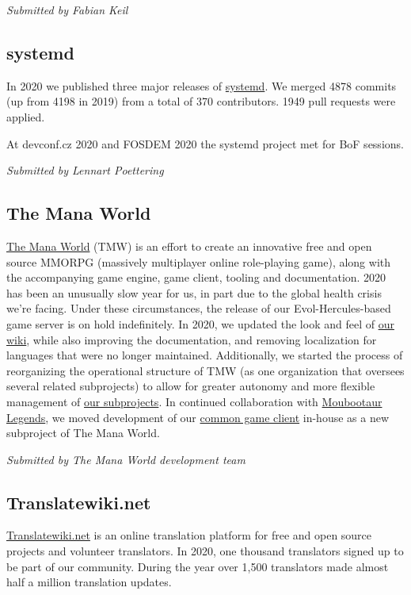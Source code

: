 \documentclass[a4paper]{report}
\begin{document}
{\em Submitted by Fabian Keil}

\subsection{systemd}

In 2020 we published three major releases of \href{https://systemd.io/}{systemd}. We merged 4878 commits (up from 4198 in 2019) from a total of 370 contributors. 1949 pull requests were applied.

At devconf.cz 2020 and FOSDEM 2020 the systemd project met for BoF sessions.

{\em Submitted by Lennart Poettering}

\subsection{The Mana World}

\href{https://www.themanaworld.org/about}{The Mana World} (TMW) is an effort to create an innovative free and open source MMORPG (massively multiplayer online role-playing game), along with the accompanying game engine, game client, tooling and documentation. 2020 has been an unusually slow year for us, in part due to the global health crisis we're facing. Under these circumstances, the release of our Evol-Hercules-based game server is on hold indefinitely. In 2020, we updated the look and feel of \href{https://wiki.themanaworld.org/}{our wiki}, while also improving the documentation, and removing localization for languages that were no longer maintained. Additionally, we started the process of reorganizing the operational structure of TMW (as one organization that oversees several related subprojects) to allow for greater autonomy and more flexible management of \href{https://gitlab.com/themanaworld}{our subprojects}. In continued collaboration with \href{https://moubootaurlegends.org/en/}{Moubootaur Legends}, we moved development of our \href{https://gitlab.com/themanaworld/manaplus/manaplus}{common game client} in-house as a new subproject of The Mana World.

{\em Submitted by The Mana World development team}

\subsection{Translatewiki.net}

\href{https://translatewiki.net/}{Translatewiki.net} is an online translation platform for free and open source projects and volunteer translators. In 2020, one thousand translators signed up to be part of our community. During the year over 1,500 translators made almost half a million translation updates.
\end{document}
